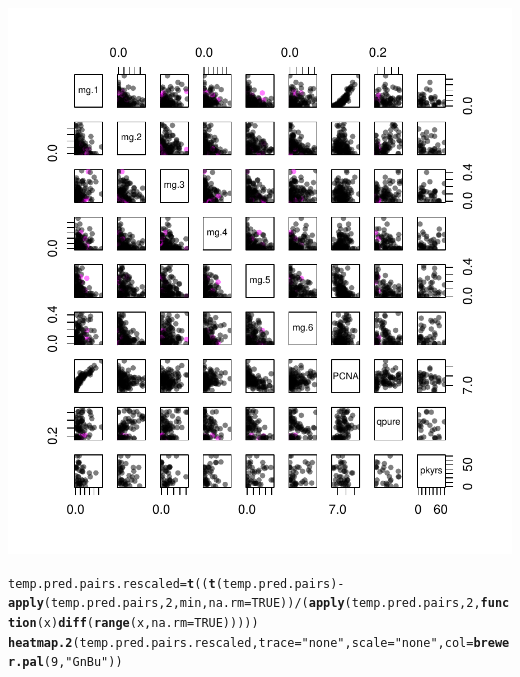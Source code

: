 \documentclass{article}\usepackage[]{graphicx}\usepackage[]{color}
\makeatletter
\def\maxwidth{ %
  \ifdim\Gin@nat@width>\linewidth
    \linewidth
  \else
    \Gin@nat@width
  \fi
}
\newcommand{\hlnum}[1]{\textcolor[rgb]{0.686,0.059,0.569}{#1}}%
\newcommand{\hlstr}[1]{\textcolor[rgb]{0.192,0.494,0.8}{#1}}%
\newcommand{\hlopt}[1]{\textcolor[rgb]{0,0,0}{#1}}%
\newcommand{\hlstd}[1]{\textcolor[rgb]{0.345,0.345,0.345}{#1}}%
\newcommand{\hlkwa}[1]{\textcolor[rgb]{0.161,0.373,0.58}{\textbf{#1}}}%
\newcommand{\hlkwb}[1]{\textcolor[rgb]{0.69,0.353,0.396}{#1}}%
\newcommand{\hlkwc}[1]{\textcolor[rgb]{0.333,0.667,0.333}{#1}}%
\newcommand{\hlkwd}[1]{\textcolor[rgb]{0.737,0.353,0.396}{\textbf{#1}}}%
\newenvironment{kframe}{%
 \def\at@end@of@kframe{}%
 \ifinner\ifhmode%
  \def\at@end@of@kframe{\end{minipage}}%
  \begin{minipage}{\columnwidth}%
 \fi\fi%
 \def\FrameCommand##1{\hskip\@totalleftmargin \hskip-\fboxsep
 \colorbox{shadecolor}{##1}\hskip-\fboxsep
     \hskip-\linewidth \hskip-\@totalleftmargin \hskip\columnwidth}%
 \MakeFramed {\advance\hsize-\width
   \@totalleftmargin\z@ \linewidth\hsize
   \@setminipage}}%
 {\par\unskip\endMakeFramed%
 \at@end@of@kframe}
\newenvironment{knitrout}{}{} %
\makeatother
\begin{document}
\begin{knitrout}
{\centering \includegraphics[width=\maxwidth]{figure/metagene-pairs-1} 

}


\begin{kframe}\begin{alltt}
\hlstd{temp.pred.pairs.rescaled} \hlkwb{=} \hlkwd{t}\hlstd{((}\hlkwd{t}\hlstd{(temp.pred.pairs)} \hlopt{-} \hlkwd{apply}\hlstd{(temp.pred.pairs,} \hlnum{2}\hlstd{, min,} \hlkwc{na.rm} \hlstd{=} \hlnum{TRUE}\hlstd{))} \hlopt{/} \hlstd{(}\hlkwd{apply}\hlstd{(temp.pred.pairs,} \hlnum{2}\hlstd{,} \hlkwa{function}\hlstd{(}\hlkwc{x}\hlstd{)} \hlkwd{diff}\hlstd{(}\hlkwd{range}\hlstd{(x,} \hlkwc{na.rm} \hlstd{=} \hlnum{TRUE}\hlstd{)))))}
\hlkwd{heatmap.2}\hlstd{(temp.pred.pairs.rescaled,} \hlkwc{trace} \hlstd{=} \hlstr{"none"}\hlstd{,} \hlkwc{scale} \hlstd{=} \hlstr{"none"}\hlstd{,} \hlkwc{col} \hlstd{=} \hlkwd{brewer.pal}\hlstd{(}\hlnum{9}\hlstd{,} \hlstr{"GnBu"}\hlstd{))}
\end{alltt}
\end{kframe}


\end{knitrout}
\end{document}
